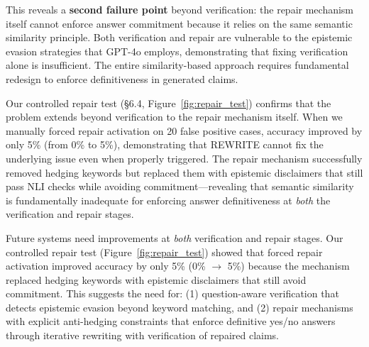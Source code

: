 This reveals a \textbf{second failure point} beyond verification: the repair
mechanism itself cannot enforce answer commitment because it relies on the same
semantic similarity principle. Both verification and repair are vulnerable to the
epistemic evasion strategies that GPT-4o employs, demonstrating that fixing
verification alone is insufficient. The entire similarity-based approach requires
fundamental redesign to enforce definitiveness in generated claims.



Our controlled repair test (\S6.4, Figure~\ref{fig:repair_test}) confirms that
the problem extends beyond verification to the repair mechanism itself. When we
manually forced repair activation on 20 false positive cases, accuracy improved
by only 5\% (from 0\% to 5\%), demonstrating that REWRITE cannot fix the
underlying issue even when properly triggered. The repair mechanism successfully
removed hedging keywords but replaced them with epistemic disclaimers that still
pass NLI checks while avoiding commitment---revealing that semantic similarity is
fundamentally inadequate for enforcing answer definitiveness at \textit{both}
the verification and repair stages.



Future systems need improvements at \textit{both} verification and repair stages.
Our controlled repair test (Figure~\ref{fig:repair_test}) showed that forced
repair activation improved accuracy by only 5\% (0\% $\to$ 5\%) because the
mechanism replaced hedging keywords with epistemic disclaimers that still avoid
commitment. This suggests the need for: (1) question-aware verification that
detects epistemic evasion beyond keyword matching, and (2) repair mechanisms with
explicit anti-hedging constraints that enforce definitive yes/no answers through
iterative rewriting with verification of repaired claims.






